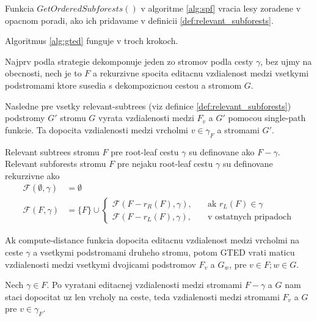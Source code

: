 \begin{pozn}
  Funkcia $Get Ordered Subforests()$ v algoritme \ref{alg:spf} vracia lesy zoradene
  v opacnom poradi, ako ich pridavame v definicii \ref{def:relevant_subforests}.
\end{pozn}

Algoritmus \ref{alg:gted} funguje v troch krokoch.

Najprv podla strategie dekomponuje jeden zo stromov podla cesty $\gamma$,
bez ujmy na obecnosti, nech je to $F$ a rekurzivne spocita editacnu vzdialenost
medzi vsetkymi podstromami ktore susedia s dekompozicnou cestou a stromom $G$.

Nasledne pre vsetky relevant-subtrees (viz definice \ref{def:relevant_subforests})
podstromy $G'$ stromu $G$ vyrata vzdialenosti medzi $F_{v}$ a $G'$ pomocou single-path funkcie.
Ta dopocita vzdialenosti medzi vrcholmi $v \in \gamma_{F}$ a stromami $G'$.

\begin{definice}
  \label{def:relevant_subforests}
	Relevant subtrees stromu $F$ pre root-leaf cestu $\gamma$ su definovane ako $F - \gamma$.
	Relevant subforests stromu $F$ pre nejaku root-leaf cestu $\gamma$ su definovane rekurzivne ako
	\begin{align*}
    \mathcal{F}(\emptyset, \gamma) &= \emptyset
		\\
		\mathcal{F}(F, \gamma) &= \{F\} \cup
		\begin{cases}
      \mathcal{F}(F - r_{R}(F), \gamma), \quad{} &\text{ak $r_{L}(F) \in \gamma$}
			\\
      \mathcal{F}(F - r_{L}(F), \gamma), &\text{v ostatnych pripadoch}
		\end{cases}
	\end{align*}
\end{definice}

\begin{lemma}
  Ak compute-distance funkcia dopocita editacnu vzdialenost medzi vrcholmi na ceste $\gamma$
  a vsetkymi podstromami druheho stromu, potom GTED vrati maticu vzdialenosti
  medzi vsetkymi dvojicami podstromov $F_{v}$ a $G_{w}$, pre $v \in F; w \in G$.
\end{lemma}

\begin{dukaz}
  Nech $\gamma \in F$. Po vyratani editacnej vzdialenosti medzi stromami
  $F - \gamma$ a $G$ nam staci dopocitat uz len vrcholy na ceste,
  teda vzdialenosti medzi stromami $F_{v}$ a $G$ pre $v \in \gamma_{F}$.
\end{dukaz}

